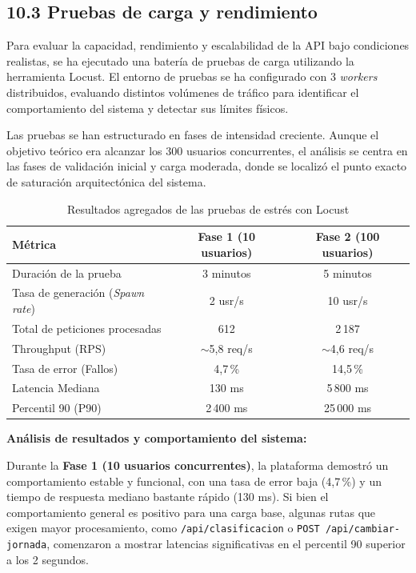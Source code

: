 \subsection{10.3 Pruebas de carga y rendimiento}
\label{sec:pruebas-carga}

Para evaluar la capacidad, rendimiento y escalabilidad de la API bajo condiciones realistas, se ha ejecutado una batería de pruebas de carga utilizando la herramienta Locust. El entorno de pruebas se ha configurado con 3 \textit{workers} distribuidos, evaluando distintos volúmenes de tráfico para identificar el comportamiento del sistema y detectar sus límites físicos.

Las pruebas se han estructurado en fases de intensidad creciente. Aunque el objetivo teórico era alcanzar los 300 usuarios concurrentes, el análisis se centra en las fases de validación inicial y carga moderada, donde se localizó el punto exacto de saturación arquitectónica del sistema.

\begin{table}[H]
\centering
\caption{Resultados agregados de las pruebas de estrés con Locust}
\label{tab:resultados-carga}
\renewcommand{\arraystretch}{1.3}
\begin{tabular}{lcc}
\hline
\textbf{Métrica} & \textbf{Fase 1 (10 usuarios)} & \textbf{Fase 2 (100 usuarios)} \\
\hline
Duración de la prueba & 3 minutos & 5 minutos \\
Tasa de generación (\textit{Spawn rate}) & 2 usr/s & 10 usr/s \\
Total de peticiones procesadas & 612 & 2\,187 \\
Throughput (RPS) & $\sim$5{,}8 req/s & $\sim$4{,}6 req/s \\
Tasa de error (Fallos) & 4{,}7\,\% & 14{,}5\,\% \\
Latencia Mediana & 130 ms & 5\,800 ms \\
Percentil 90 (P90) & 2\,400 ms & 25\,000 ms \\
\hline
\end{tabular}
\end{table}

\textbf{Análisis de resultados y comportamiento del sistema:}

Durante la \textbf{Fase 1 (10 usuarios concurrentes)}, la plataforma demostró un comportamiento estable y funcional, con una tasa de error baja (4{,}7\,\%) y un tiempo de respuesta mediano bastante rápido (130 ms). Si bien el comportamiento general es positivo para una carga base, algunas rutas que exigen mayor procesamiento, como \texttt{/api/clasificacion} o \texttt{POST /api/cambiar-jornada}, comenzaron a mostrar latencias significativas en el percentil 90 superior a los 2 segundos.

